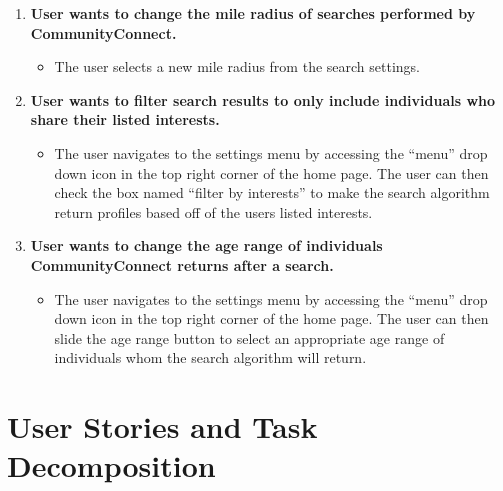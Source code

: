 \documentclass[12pt]{article}
\begin{document}
\begin{enumerate}
    \item \textbf{User wants to change the mile radius of searches performed by CommunityConnect.}
      \begin{itemize}
        \item The user selects a new mile radius from the search settings.
      \end{itemize}

    \item  \textbf{User wants to filter search results to only include individuals who share their listed interests.}
      \begin{itemize}
        \item The user navigates to the settings menu by accessing the “menu” drop down icon in the top right corner of the home page. The user can then check the box named “filter by interests” to make the search algorithm return profiles based off of the users listed interests.
      \end{itemize}

    \item  \textbf{User wants to change the age range of individuals CommunityConnect returns after a search.}
      \begin{itemize}
        \item The user navigates to the settings menu by accessing the “menu” drop down icon in the top right corner of the home page. The user can then slide the age range button to select an appropriate age range of individuals whom the search algorithm will return.
      \end{itemize}

  \end{enumerate}

\section{\bf  User Stories and Task Decomposition}
\end{document}
